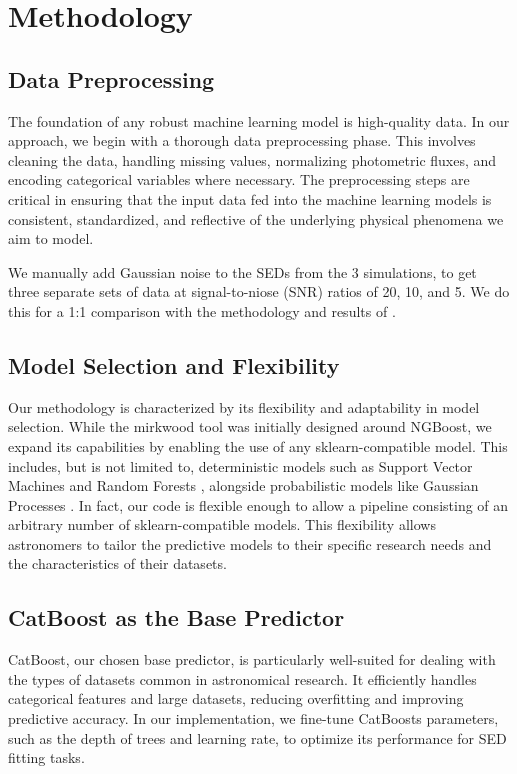 \documentclass[letterpaper]{article} %
\begin{document}
\section{Methodology}
\subsection{Data Preprocessing}
The foundation of any robust machine learning model is high-quality data. In our approach, we begin with a thorough data preprocessing phase. This involves cleaning the data, handling missing values, normalizing photometric fluxes, and encoding categorical variables where necessary. The preprocessing steps are critical in ensuring that the input data fed into the machine learning models is consistent, standardized, and reflective of the underlying physical phenomena we aim to model.

We manually add Gaussian noise to the SEDs from the 3 simulations, to get three separate sets of data at signal-to-niose (SNR) ratios of 20, 10, and 5. We do this for a 1:1 comparison with the methodology and results of \citet{Gilda21}.

\subsection{Model Selection and Flexibility}
Our methodology is characterized by its flexibility and adaptability in model selection. While the mirkwood tool was initially designed around NGBoost, we expand its capabilities by enabling the use of any sklearn-compatible model. This includes, but is not limited to, deterministic models such as Support Vector Machines \cite{soentpiet1999advances} and Random Forests \cite{randomforests}, alongside probabilistic models like Gaussian Processes \cite{gaussian_processes}. In fact, our code is flexible enough to allow a pipeline consisting of an arbitrary number of sklearn-compatible models. This flexibility allows astronomers to tailor the predictive models to their specific research needs and the characteristics of their datasets.

\subsection{CatBoost as the Base Predictor}
CatBoost, our chosen base predictor, is particularly well-suited for dealing with the types of datasets common in astronomical research. It efficiently handles categorical features and large datasets, reducing overfitting and improving predictive accuracy. In our implementation, we fine-tune CatBoosts parameters, such as the depth of trees and learning rate, to optimize its performance for SED fitting tasks.
\end{document}
